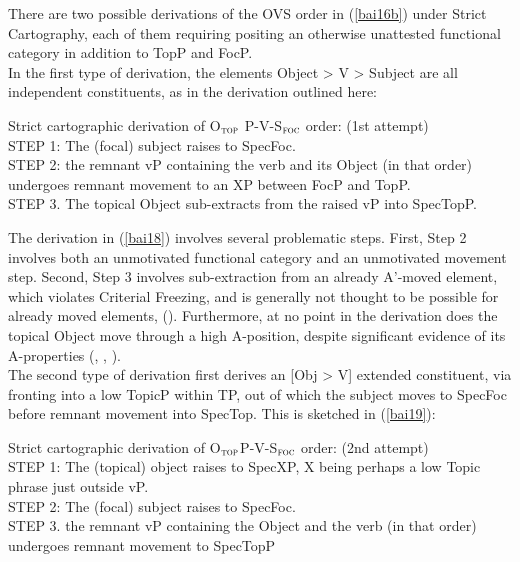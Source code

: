 \documentclass[output=paper,colorlinks,citecolor=brown,
]{langscibook}
\begin{document}
There are two possible derivations of the OVS order in (\ref{bai16b}) under Strict Cartography, each of them requiring positing an otherwise unattested functional category in addition to TopP and FocP.  \\ 
In the first type of derivation, the elements Object > V > Subject are all independent constituents, as in the derivation outlined here:

\begin{exe}
\ex \label{bai18}
Strict cartographic derivation of O$_{\textsc{top}}$ P-V-S$_{\textsc{foc}}$ order: (1st attempt) \\
STEP 1:  The (focal) subject raises to SpecFoc. \\
STEP 2:  the remnant vP containing the verb and its Object (in that order) undergoes remnant movement to an XP between FocP and TopP. \\
STEP 3.  The topical Object sub-extracts from the raised vP into SpecTopP.\\

\end{exe}

The derivation in (\ref{bai18}) involves several problematic steps. First, Step 2 involves both an unmotivated functional category and an unmotivated movement step. Second, Step 3 involves sub-extraction from an already A’-moved element, which violates \citealt{Rizzi2004} Criterial Freezing, and is generally not thought to be possible for already moved elements, (\citealt{Stepanov2007}). Furthermore, at no point in the derivation does the topical Object move through a high A-position, despite significant evidence of its A-properties (\citealt{Bailyn2004}, \citealt{Antonyuk2021}, \citealt{Pereltsvaig2021}). \\

The second type of derivation first derives an [Obj > V] extended constituent, via fronting into a low TopicP within TP, out of which the subject moves to SpecFoc before remnant movement into SpecTop.  This is sketched in (\ref{bai19}): 

\begin{exe}
\ex \label{bai19}
Strict cartographic derivation of O$_{\textsc{top}}$P-V-S$_{\textsc{foc}}$ order: (2nd attempt) \\
STEP 1:  The (topical) object raises to SpecXP, X being perhaps a low Topic phrase just outside vP. \\
STEP 2:  The (focal) subject raises to SpecFoc. \\
STEP 3.  the remnant vP containing the Object and the verb (in that order) undergoes remnant movement to SpecTopP \\
\end{exe}
\end{document}
